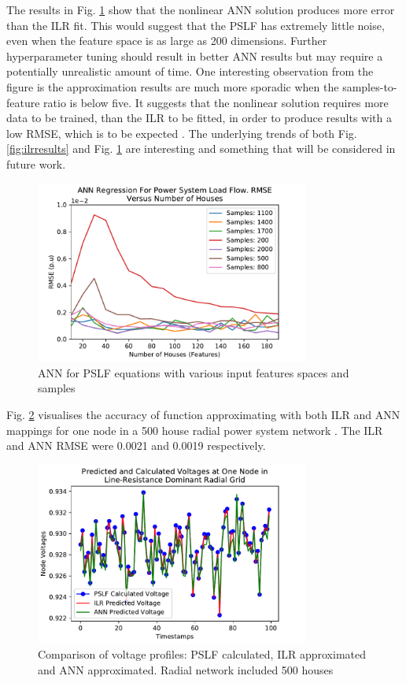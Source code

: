 \documentclass[conference]{IEEEtran}
\begin{document}
The results in Fig. \ref{fig:annresults} show that the nonlinear ANN solution produces more error than the ILR fit. This would suggest that the PSLF has extremely little noise, even when the feature space is as large as 200 dimensions. Further hyperparameter tuning should result in better ANN results but may require a potentially unrealistic amount of time. One interesting observation from the figure is the approximation results are much more sporadic when the samples-to-feature ratio is below five. It suggests that the nonlinear solution requires more data to be trained, than the ILR to be fitted, in order to produce results with a low RMSE, which is to be expected \cite{gema1992}. The underlying trends of both Fig. \ref{fig:ilrresults} and Fig. \ref{fig:annresults} are interesting and something that will be considered in future work.

\begin{figure}[h]
	\centering
	\includegraphics[width=9cm]{annrmsevsfeatures_familyofcurves.pdf}
	\caption{ANN for PSLF equations with various input features spaces and samples}
	\label{fig:annresults}
\end{figure}

Fig. \ref{fig:comparison} visualises the accuracy of function approximating with both ILR and ANN mappings for one node in a 500 house radial power system network	. The ILR and ANN RMSE were 0.0021 and 0.0019 respectively.

\begin{figure}[h]
	\centering
	\includegraphics[width=9cm]{comparingvoltages_500.pdf}
	\caption{Comparison of voltage profiles: PSLF calculated, ILR approximated and ANN approximated. Radial network included 500 houses}
	\label{fig:comparison}
\end{figure}
\end{document}
